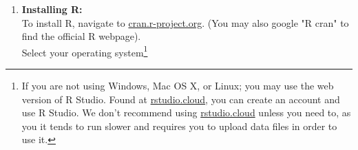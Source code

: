 \documentclass[12pt,letterpaper]{article}
\begin{document}
\begin{enumerate}

	\item \textbf{Installing R:}\\ \vspace{1em}
		To install R, navigate to \href{https://cran.r-project.org/}{cran.r-project.org}. (You may also google "R cran" to find the official R webpage).\\
\vspace*{1em}
		Select your operating system\footnote{If you are not using Windows, Mac OS X, or Linux; you may use the web version of R Studio. Found at \href{https://rstudio.cloud/}{rstudio.cloud}, you can create an account and use R Studio. We don't recommend using \href{https://rstudio.cloud/}{rstudio.cloud} unless you need to, as you it tends to run slower and requires you to upload data files in order to use it.}
		
\vspace*{1em}		
		

\end{enumerate}
\end{document}
